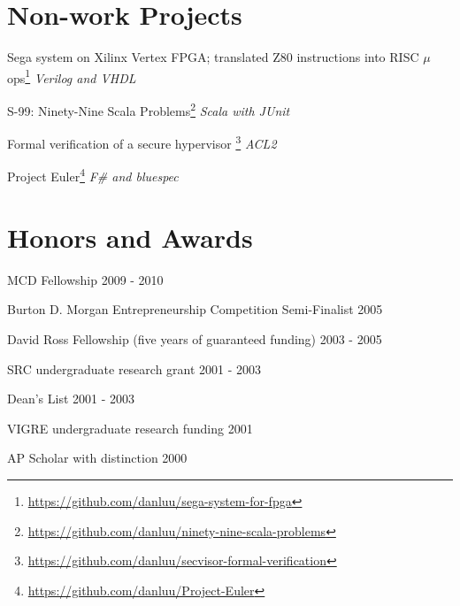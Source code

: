 \documentclass[letterpaper]{scrartcl}
\begin{document}
\section*{Non-work Projects}
\begin{list1}
\item
  \begin{list2}
  \item Sega system on Xilinx Vertex FPGA; translated Z80 instructions into RISC $\mu$ops\footnote{\href{https://github.com/danluu/sega-system-for-fpga}{https://github.com/danluu/sega-system-for-fpga}}  \hfill \emph{Verilog and VHDL}
  \item S-99: Ninety-Nine Scala Problems\footnote{\href{https://github.com/danluu/ninety-nine-scala-problems}
    {https://github.com/danluu/ninety-nine-scala-problems}} \hfill \emph{Scala with JUnit}
  \item Formal verification of a secure hypervisor \footnote{\href{https://github.com/danluu/secvisor-formal-verification}{https://github.com/danluu/secvisor-formal-verification}} \hfill \emph{ACL2}
  \item Project Euler\footnote{\href{https://github.com/danluu/Project-Euler}{https://github.com/danluu/Project-Euler}} \hfill \emph{F\# and bluespec}


  \end{list2}
\end{list1}


%
%
\section*{Honors and Awards}
\begin{list1}
\item
  \begin{list2}
  \item MCD Fellowship \hfill 2009 - 2010
  \item Burton D. Morgan Entrepreneurship Competition Semi-Finalist \hfill 2005
  \item David Ross Fellowship (five years of guaranteed funding) \hfill 2003 - 2005
  \item SRC undergraduate research grant \hfill 2001 - 2003
  \item Dean's List \hfill 2001 - 2003
  \item VIGRE undergraduate research funding \hfill 2001
  \item AP Scholar with distinction \hfill 2000
  \end{list2}
\end{list1}
\end{document}
